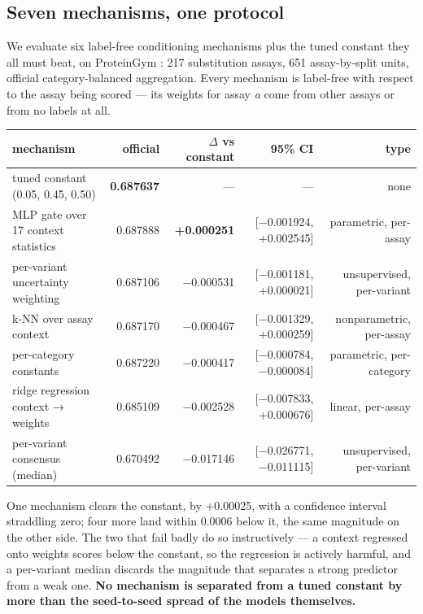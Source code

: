 \documentclass[sigconf,review,nonacm]{acmart}
\begin{document}
\subsection{Seven mechanisms, one protocol}\label{seven-mechanisms-one-protocol}

We evaluate six label-free conditioning mechanisms plus the tuned constant they all must beat, on
ProteinGym \cite{proteingym}: 217 substitution assays, 651 assay-by-split units, official
category-balanced aggregation. Every mechanism is label-free with respect to the assay being scored ---
its weights for assay \emph{a} come from other assays or from no labels at all.

\begin{table}[t]
\centering
\small
\begin{tabular}{lrrrr}
\hline
mechanism & official & $\Delta$ vs constant & 95\% CI & type \\
\hline
tuned constant (0.05, 0.45, 0.50) & \textbf{0.687637} & --- & --- & none \\
MLP gate over 17 context statistics & 0.687888 & \textbf{+0.000251} & [$-$0.001924, +0.002545] & parametric, per-assay \\
per-variant uncertainty weighting & 0.687106 & $-$0.000531 & [$-$0.001181, +0.000021] & unsupervised, per-variant \\
k-NN over assay context & 0.687170 & $-$0.000467 & [$-$0.001329, +0.000259] & nonparametric, per-assay \\
per-category constants & 0.687220 & $-$0.000417 & [$-$0.000784, $-$0.000084] & parametric, per-category \\
ridge regression context → weights & 0.685109 & $-$0.002528 & [$-$0.007833, +0.000676] & linear, per-assay \\
per-variant consensus (median) & 0.670492 & $-$0.017146 & [$-$0.026771, $-$0.011115] & unsupervised, per-variant \\
\hline
\end{tabular}
\end{table}

One mechanism clears the constant, by +0.00025, with a confidence interval straddling zero; four more
land within 0.0006 below it, the same magnitude on the other side. The two that fail badly do so
instructively --- a context regressed onto weights scores below the constant, so the regression is actively
harmful, and a per-variant median discards the magnitude that separates a strong predictor from a weak
one. \textbf{No mechanism is separated from a tuned constant by more than the seed-to-seed spread of the models
themselves.}
\end{document}
